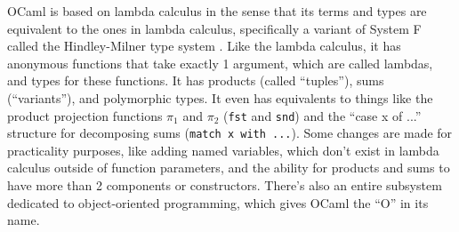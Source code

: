 \documentclass[12pt]{article}
\begin{document}
OCaml is based on lambda calculus in the sense that its terms and types are equivalent to the ones in lambda calculus, specifically a variant of System F called the Hindley-Milner type system \cite{pierce}. Like the lambda calculus, it has anonymous functions that take exactly 1 argument, which are called lambdas, and types for these functions. It has products (called ``tuples''), sums (``variants''), and polymorphic types. It even has equivalents to things like the product projection functions $\pi_1$ and $\pi_2$ (\texttt{fst} and \texttt{snd}) and the ``case x of ...'' structure for decomposing sums (\texttt{match x with ...}). Some changes are made for practicality purposes, like adding named variables, which don't exist in lambda calculus outside of function parameters, and the ability for products and sums to have more than 2 components or constructors. There's also an entire subsystem dedicated to object-oriented programming, which gives OCaml the ``O'' in its name.

\end{document}
